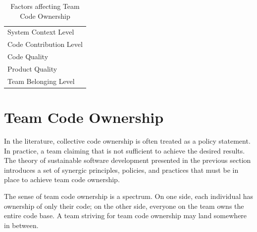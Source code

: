 
\begin{table}[]
\renewcommand{\arraystretch}{1.5}
\centering
\caption{Factors affecting Team Code Ownership}
\label{TeamCodeOwnerhipFactors}
\begin{tabular}{|p{3.1in}|}
\hline
System Context Level \\
Code Contribution Level \\
Code Quality \\
Product Quality \\
Team Belonging Level \\
\hline
\end{tabular}
\end{table}

\section{Team Code Ownership}
\label{TeamCodeOwnership}

In the literature, collective code ownership is often treated as a policy statement. In practice, a team claiming that  is not sufficient to achieve the desired results. The theory of sustainable software development presented in the previous section introduces a set of synergic principles, policies, and practices that must be in place to achieve team code ownership. 

The sense of team code ownership is a spectrum. On one side, each individual has ownership of only their code;  on the other side, everyone on the team owns the entire code base. A team striving for team code ownership may land somewhere in between. 

